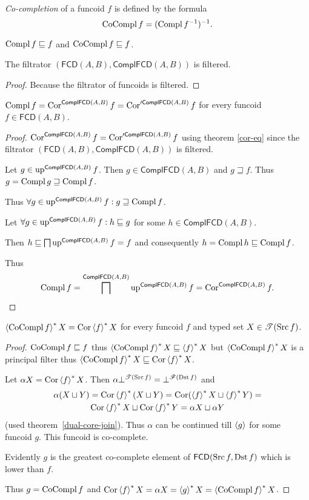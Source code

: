 \begin{defn}
\emph{Co-completion} of a funcoid
$f$ is defined by the formula
\[
\operatorname{CoCompl} f=(\operatorname{Compl} f^{-1})^{-1}.
\]
\end{defn}
\begin{obvious}
$\operatorname{Compl} f\sqsubseteq f$ and $\operatorname{CoCompl} f\sqsubseteq f$.\end{obvious}
\begin{prop}
The filtrator $(\mathsf{FCD}(A,B),\mathsf{ComplFCD}(A,B))$ is
filtered.\end{prop}
\begin{proof}
Because the filtrator of funcoids is filtered.\end{proof}
\begin{thm}
$\operatorname{Compl} f=\operatorname{Cor}^{\mathsf{ComplFCD}(A,B)}f=\operatorname{Cor}'^{\mathsf{ComplFCD}(A,B)}f$
for every funcoid $f\in\mathsf{FCD}(A,B)$.\end{thm}
\begin{proof}
$\operatorname{Cor}^{\mathsf{ComplFCD}(A,B)}f=\operatorname{Cor}'^{\mathsf{ComplFCD}(A,B)}f$
using theorem \ref{cor-eq} since the filtrator
$(\mathsf{FCD}(A,B),\mathsf{ComplFCD}(A,B))$
is filtered.

Let $g\in\operatorname{up}^{\mathsf{ComplFCD}(A,B)}f$. Then
$g\in\mathsf{ComplFCD}(A,B)$ and $g\sqsupseteq f$. Thus $g=\operatorname{Compl}
g\sqsupseteq\operatorname{Compl} f$.

Thus $\forall g\in\operatorname{up}^{\mathsf{ComplFCD}(A,B)}f:g\sqsupseteq\operatorname{Compl} f$.

Let $\forall g\in\operatorname{up}^{\mathsf{ComplFCD}(A,B)}f:h\sqsubseteq g$
for some $h\in\mathsf{ComplFCD}(A,B)$.

Then $h\sqsubseteq\bigsqcap\operatorname{up}^{\mathsf{ComplFCD}(A,B)}f=f$
and consequently $h=\operatorname{Compl} h\sqsubseteq\operatorname{Compl} f$.

Thus
\[
\operatorname{Compl}
f=\bigsqcap^{\mathsf{ComplFCD}(A,B)}\operatorname{up}^{\mathsf{ComplFCD}(A,B)}f=\operatorname{Cor}^{\mathsf{
ComplFCD}(A,B)}f.
\]
\end{proof}
\begin{thm}
$\left\langle \operatorname{CoCompl} f\right\rangle ^{\ast}X=\operatorname{Cor}\left\langle f\right\rangle ^{\ast}X$ for every funcoid $f$ and
typed set $X\in\mathscr{T}(\operatorname{Src} f)$.\end{thm}
\begin{proof}
$\operatorname{CoCompl} f\sqsubseteq f$ thus $\left\langle \operatorname{CoCompl} f\right\rangle ^{\ast}X\sqsubseteq\left\langle f\right\rangle ^{\ast}X$
but $\left\langle \operatorname{CoCompl} f\right\rangle ^{\ast}X$ is a principal filter thus $\left\langle \operatorname{CoCompl}
f\right\rangle ^{\ast}X\sqsubseteq\operatorname{Cor}\left\langle f\right\rangle ^{\ast}X$.

Let $\alpha X=\operatorname{Cor}\left\langle f\right\rangle ^{\ast}X$. Then $\alpha\bot^{\mathscr{T}(\operatorname{Src}
f)}=\bot^{\mathscr{F}(\operatorname{Dst} f)}$
and
\begin{multline*}
\alpha(X\sqcup Y)=\operatorname{Cor}\left\langle f\right\rangle ^{\ast}(X\sqcup Y)=\operatorname{Cor}(\left\langle f\right\rangle ^{\ast}X\sqcup\left\langle f\right\rangle ^{\ast}Y)=\\
\operatorname{Cor}\left\langle f\right\rangle ^{\ast}X\sqcup\operatorname{Cor}\left\langle f\right\rangle ^{\ast}Y=\alpha X\sqcup\alpha Y
\end{multline*}
(used theorem~\ref{dual-core-join}). Thus $\alpha$ can be continued
till $\left\langle g\right\rangle$ for some funcoid $g$. This funcoid is co-complete.

Evidently $g$ is the greatest co-complete element of $\mathsf{FCD}(\operatorname{Src} f,\operatorname{Dst}
f)$
which is lower than $f$.

Thus $g=\operatorname{CoCompl} f$ and $\operatorname{Cor}\left\langle f\right\rangle ^{\ast}X=\alpha X=\left\langle g\right\rangle ^{\ast}X=\left\langle \operatorname{CoCompl}
f\right\rangle ^{\ast}X$.\end{proof}
